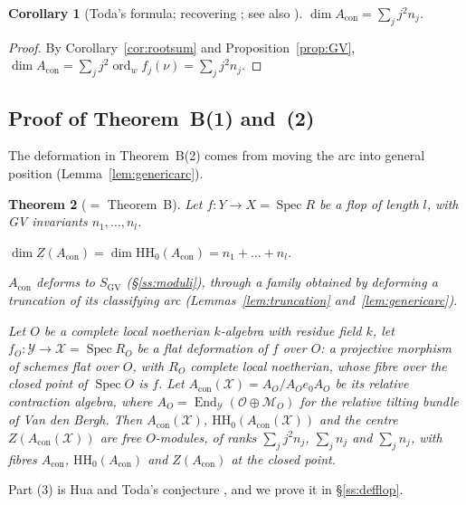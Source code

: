 \documentclass[11pt]{amsart}
\numberwithin{table}{section}
\numberwithin{figure}{section}
\numberwithin{equation}{section}
\newtheorem{thm}{Theorem}[section]
\newtheorem{cor}[thm]{Corollary}
\theoremstyle{definition}
\theoremstyle{plain}
\newcommand{\Acon}{A_{\mathrm{con}}}
\newcommand{\cO}{\mathcal{O}}
\newcommand{\SGV}{S_{\mathrm{GV}}}
\newcommand{\HH}{\mathrm{HH}}
\DeclareMathOperator{\Spec}{Spec}
\DeclareMathOperator{\End}{End}
\DeclareMathOperator{\ord}{ord}
\begin{document}
\begin{cor}[{Toda's formula; recovering \cite[Thm~1.1]{T}; see also \cite[Cor~4.5]{HT}}]\label{cor:toda}
$\dim \Acon = \sum_j j^2 n_j$.
\end{cor}

\begin{proof}
By Corollary~\ref{cor:rootsum} and Proposition~\ref{prop:GV}, $\dim \Acon = \sum_j j^2 \ord_w f_j(\nu) = \sum_j j^2 n_j$.
\end{proof}

\subsection{Proof of Theorem~B(1) and~(2)}\label{ss:proofB}

The deformation in Theorem~B(2) comes from moving the arc into general position (Lemma~\ref{lem:genericarc}).

\begin{thm}[$=$ Theorem~B]\label{thm:B}
Let $f\colon Y \to X = \Spec R$ be a flop of length $l$, with GV invariants $n_1, \dots, n_l$.
\begin{thmlist}
\item $\dim Z(\Acon) = \dim \HH_0(\Acon) = n_1 + \dots + n_l$.
\item $\Acon$ deforms to $\SGV$ (\S\ref{ss:moduli}), through a family obtained by deforming a truncation of its classifying arc (Lemmas~\ref{lem:truncation} and~\ref{lem:genericarc}).
\item Let $O$ be a complete local noetherian $k$-algebra with residue field $k$, let $f_O\colon \mathcal Y \to \mathcal X = \Spec R_O$ be a flat deformation of $f$ over $O$: a projective morphism of schemes flat over $O$, with $R_O$ complete local noetherian, whose fibre over the closed point of $\Spec O$ is $f$. Let $\Acon(\mathcal X) = A_O/A_Oe_0A_O$ be its relative contraction algebra, where $A_O = \End_{\mathcal Y}(\cO \oplus \mathcal M_O)$ for the relative tilting bundle of Van den Bergh. Then $\Acon(\mathcal X)$, $\HH_0(\Acon(\mathcal X))$ and the centre $Z(\Acon(\mathcal X))$ are free $O$-modules, of ranks $\sum_j j^2 n_j$, $\sum_j n_j$ and $\sum_j n_j$, with fibres $\Acon$, $\HH_0(\Acon)$ and $Z(\Acon)$ at the closed point.
\end{thmlist}
\end{thm}

Part (3) is Hua and Toda's conjecture \cite[Conj~4.3]{HT}, and we prove it in \S\ref{ss:defflop}.
\end{document}
